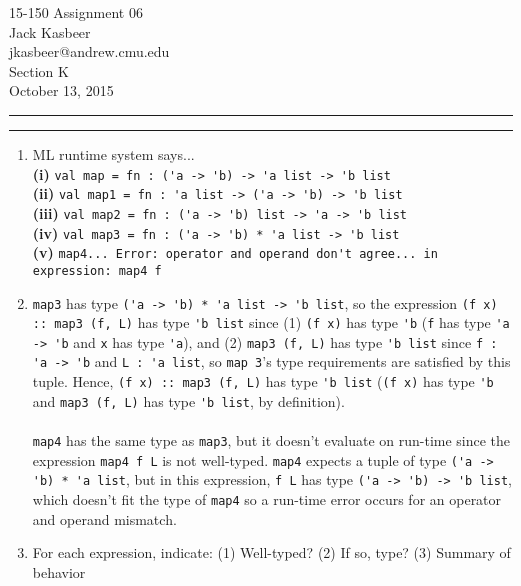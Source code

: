 \documentclass[11pt]{article}
\makeatletter
\newcommand{\question}[2] {\vspace{.25in} \hrule\vspace{0.5em}
\noindent{\bf #1: #2} \vspace{0.5em}
\hrule \vspace{.10in}}
\renewcommand{\part}[1] {\vspace{.10in} {\bf (#1)}}
\newcommand{\myname}{Jack Kasbeer}
\newcommand{\myandrew}{jkasbeer@andrew.cmu.edu}
\newcommand{\myhwnum}{06}
\makeatother
\begin{document}
\medskip            
\thispagestyle{plain}
\begin{center} 
{\Large 15-150 Assignment \myhwnum} \\
\myname \\
\myandrew \\
Section K \\
October 13, 2015 \\
\end{center}

\question{2}{Polymorphic Universe}
\begin{enumerate}
\item ML runtime system says...\\
\part{i} \verb|val map = fn : ('a -> 'b) -> 'a list -> 'b list|\\
\part{ii} \verb|val map1 = fn : 'a list -> ('a -> 'b) -> 'b list|\\ 
\part{iii} \verb|val map2 = fn : ('a -> 'b) list -> 'a -> 'b list|\\
\part{iv} \verb|val map3 = fn : ('a -> 'b) * 'a list -> 'b list|\\
\part{v} \verb|map4... Error: operator and operand don't agree... in expression: map4 f|
\item \verb|map3| has type \verb|('a -> 'b) * 'a list -> 'b list|, so the expression \verb|(f x) :: map3 (f, L)| has type \verb|'b list| since (1) \verb|(f x)| has type \verb|'b| (\verb|f| has type \verb|'a -> 'b| and \verb|x| has type \verb|'a|), and (2) \verb|map3 (f, L)| has type \verb|'b list| since \verb|f : 'a -> 'b| and \verb|L : 'a list|, so \verb|map 3|'s type requirements are satisfied by this tuple.  Hence, \verb|(f x) :: map3 (f, L)| has type \verb|'b list| (\verb|(f x)| has type \verb|'b| and \verb|map3 (f, L)| has type \verb|'b list|, by definition).\\\\
\verb|map4| has the same type as \verb|map3|, but it doesn't evaluate on run-time since the expression \verb|map4 f L| is not well-typed.  \verb|map4| expects a tuple of type \verb|('a -> 'b) * 'a list|, but in this expression, \verb|f L| has type \verb|('a -> 'b) -> 'b list|, which doesn't fit the type of \verb|map4| so a run-time error occurs for an operator and operand mismatch.
\item For each expression, indicate: (1) Well-typed? (2) If so, type? (3) Summary of behavior\\\\

\end{enumerate}
\end{document}
